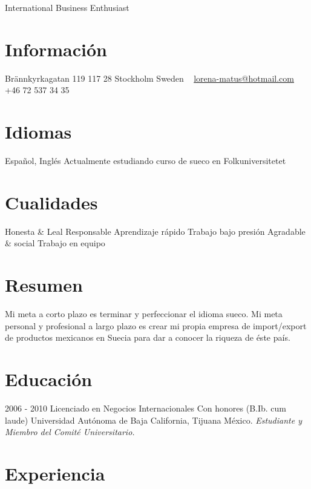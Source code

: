 \documentclass[]{friggeri-cv}
\begin{document}
       {International Business Enthusiast}

\begin{aside}
  \section{Información}
    Brännkyrkagatan 119
    117 28 Stockholm
    Sweden
    ~
    \href{mailto:lorena-matus@hotmail.com}{lorena-matus@hotmail.com}
    +46 72 537 34 35
  \section{Idiomas}
    Español, Inglés
    Actualmente estudiando curso de sueco en Folkuniversitetet
  \section{Cualidades}
    Honesta \& Leal
    Responsable
    Aprendizaje rápido
    Trabajo bajo presión
    Agradable \& social 
    Trabajo en equipo
\end{aside}

\section{Resumen}
    Mi meta a corto plazo es terminar y perfeccionar el idioma sueco.
    Mi meta personal y profesional a largo plazo es crear mi propia empresa de import/export de productos mexicanos en Suecia para dar a conocer la riqueza de éste país.

\section{Educación}

\begin{entrylist}
  \entry
    {2006 - 2010}
    {Licenciado en Negocios Internacionales}
    {Con honores (B.Ib. cum laude)}
    {Universidad Autónoma de Baja California, Tijuana México.
    {\emph{Estudiante y Miembro del Comité Universitario.}}}
\end{entrylist}

\section{Experiencia}
\end{document}
